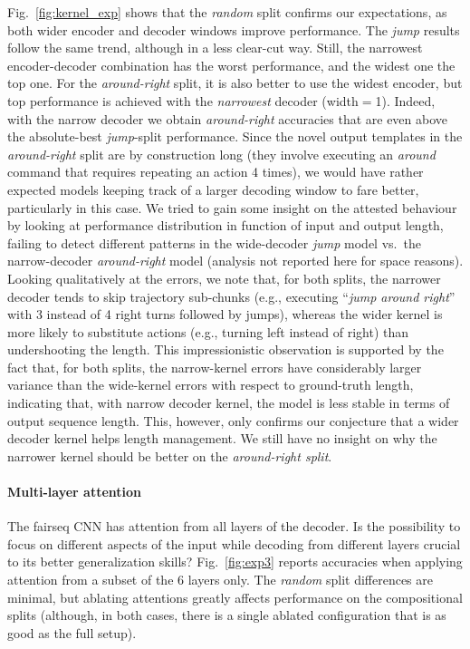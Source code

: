 Fig.~\ref{fig:kernel_exp} shows that the \emph{random} split confirms
our expectations, as both wider encoder and decoder windows improve
performance. The \emph{jump} results follow the same trend, although
in a less clear-cut way. Still, the narrowest encoder-decoder
combination has the worst performance, and the widest one the top
one. For the \emph{around-right} split, it is also better to use the
widest encoder, but top performance is achieved with the
\emph{narrowest} decoder (width$=$1). Indeed, with the narrow decoder
we obtain \emph{around-right} accuracies that are even above the
absolute-best \emph{jump}-split performance. Since the novel output
templates in the \emph{around-right} split are by construction long
(they involve executing an \emph{around} command that requires
repeating an action 4 times), we would have rather expected models
keeping track of a larger decoding window to fare better, particularly
in this case. We tried to gain some insight on the attested behaviour
by looking at performance distribution in function of input and output
length, failing to detect different patterns in the wide-decoder
\emph{jump} model vs.~the narrow-decoder \emph{around-right} model
(analysis not reported here for space reasons). Looking qualitatively
at the errors, we note that, for both splits, the narrower decoder
tends to skip trajectory sub-chunks (e.g., executing ``\emph{jump
  around right}'' with 3 instead of 4 right turns followed by jumps),
whereas the wider kernel is more likely to substitute actions (e.g.,
turning left instead of right) than undershooting the length. This
impressionistic observation is supported by the fact that, for both
splits, the narrow-kernel errors have considerably larger variance
than the wide-kernel errors with respect to ground-truth length,
indicating that, with narrow decoder kernel, the model is less stable in terms of output sequence length. This, however, only confirms our
 conjecture that a wider decoder kernel helps length management.
We still have no insight on why the narrower kernel should be better on
the \emph{around-right split}.
\paragraph{Multi-layer attention}
\label{subsec:exp3}

The fairseq CNN has attention from all layers of the
decoder. Is the possibility to focus on different aspects of the input
while decoding from different layers crucial to its better
generalization skills? Fig.~\ref{fig:exp3} reports
accuracies when applying attention from a subset of the 6
layers only. The \emph{random} split differences are minimal,
but ablating attentions greatly affects performance on the
compositional splits (although, in both cases, there is a single ablated
configuration that is as good as the full setup).

